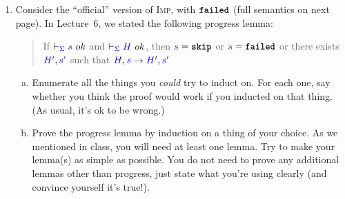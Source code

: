 \documentclass{article}
\newcommand{\meta}[1]{{\color{blue}#1}}
\newcommand{\imp}{\textsc{Imp}}
\newcommand{\impskip}{\ensuremath{\text{\ttfamily\bfseries skip}}}
\newcommand{\failed}{\ensuremath{\text{\ttfamily\bfseries failed}}}
\begin{document}
\begin{enumerate}[leftmargin=*,itemindent=*,start=1,label={{\bf Problem \arabic*}.},ref=\arabic*]
\begin{enumerate}[(a)]
  \end{enumerate}
\item Consider the ``official'' version of \imp{}, with \failed{} (full
  semantics on next page). In Lecture~6, we stated the following progress lemma:
  \begin{quote}
    If $\vdash_{\meta{\Sigma}} \meta{s}\ ok$ and
    $\vdash_{\meta{\Sigma}} \meta{H}\ ok$, then $\meta{s} = \impskip$ or
    $\meta{s} = \failed$ or there exists $\meta{H'},\meta{s'}$ such that
    $\meta{H},\meta{s} \to \meta{H'},\meta{s'}$
  \end{quote}
  \begin{enumerate}[(a)]
  \item Enumerate all the things you \emph{could} try to induct on. For each
    one, say whether you think the proof would work if you inducted on that thing.
    (As usual, it's ok to be wrong.)
  \item Prove the progress lemma by induction on a thing of your choice. As we
    mentioned in class, you will need at least one lemma. Try to make your
    lemma(s) as simple as possible.  You do not need to prove any additional
    lemmas other than progress, just state what you're using clearly (and
    convince yourself it's true!).
  \end{enumerate}

\end{enumerate}
\end{document}
